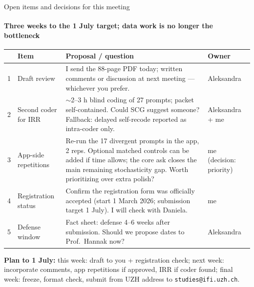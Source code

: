 \documentclass[aspectratio=169,onlytextwidth]{beamer}
\begin{document}
\begin{frame}[shrink=14]{Open items and decisions for this meeting}
\framesubtitle{Three weeks to the 1 July target; data work is no longer the bottleneck}
\scriptsize
\renewcommand{\arraystretch}{1.2}
\begin{tabularx}{\textwidth}{p{}p{}Xp{}}
\toprule
& \textbf{Item} & \textbf{Proposal / question} & \textbf{Owner} \\
\midrule
1 & Draft review & I send the 88-page PDF today; written comments or discussion at next meeting --- whichever you prefer. & Aleksandra \\[2pt]
2 & Second coder for IRR & $\sim$2--3 h blind coding of 27 prompts; packet self-contained. Could SCG suggest someone? Fallback: delayed self-recode reported as intra-coder only. & Aleksandra + me \\[2pt]
3 & App-side repetitions & Re-run the 17 divergent prompts in the app, 2 reps. Optional matched controls can be added if time allows; the core ask closes the main remaining stochasticity gap. Worth prioritizing over extra polish? & me (decision: priority) \\[2pt]
4 & Registration status & Confirm the registration form was officially accepted (start 1 March 2026; submission target 1 July). I will check with Daniela. & me \\[2pt]
5 & Defense window & Fact sheet: defense 4--6 weeks after submission. Should we propose dates to Prof.\ Hannak now? & Aleksandra \\
\bottomrule
\end{tabularx}
\vspace{0.15cm}
\small\textbf{Plan to 1 July:} this week: draft to you + registration check; next week: incorporate comments, app repetitions if approved, IRR if coder found; final week: freeze, format check, submit from UZH address to \texttt{studies@ifi.uzh.ch}.
\end{frame}
\end{document}
